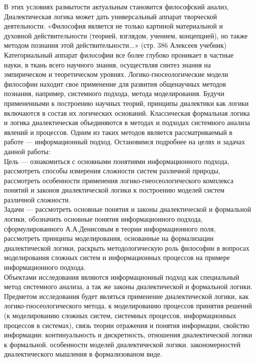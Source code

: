 \documentclass[a4paper,12pt]{report}
\begin{document}
В этих условиях размытости актуальным становится философский анализ, Диалектическая логика может дать универсальный аппарат творческой деятельности. «Философия является не только картиной материальной и духовной действительности (теорией, взглядом, учением, концепцией), но также методом познания этой действительности...»  (стр. 386 Алексеев учебник) Категориальный аппарат философии  все более глубоко проникает в частные науки, в ткань всего научного знания, осуществляя синтез знания на эмпирическом и теоретическом уровнях. Логико-гносеологические модели философии находит свое применение для развития общенаучных методов познания, например, системного подхода, метода моделирования. Будучи примененными к построению научных теорий, принципы диалектики как логики включаются в состав их логических оснований.
Классическая формальная логика и логика диалектическая объединяются в методах и подходах системного анализа явлений и процессов. Одним из таких методов является рассматриваемый в работе — информационный подход. Остановимся подробнее на целях и задачах данной работы:\\

	Цель — ознакомиться с основными понятиями информационного подхода, рассмотреть способы измерения сложности систем различной природы, рассмотреть особенности применения логико-гнеосеологического комплекса понятий и законов диалектической логики к построению моделей систем различной сложности.\\
	
	Задачи —  рассмотреть основные понятия и законы диалектической и формальной логики,  обозначить основные понятия информационного подхода, сформулированного А.А.Денисовым в теории информационного поля, рассмотреть принципы моделирования, основанные на формализации диалектической логики, раскрыть методологическую роль философии в  вопросах моделирования сложных систем и информационных процессов на примере информационного подхода. \\
	
	Объектами исследования являются информационный подход как специальный метод системного анализа, а так же законы диалектической и формальной логики.\\
	
	Предметом исследования будет являться применение диалектической логики, как логико-гносеологического метода, к моделированию процессов принятия решений (к моделированию сложных систем, системных процессов, информационных процессов в системах), связь теории отражения и понятия информации, свойство информации: континуальность и дискретность,  отношения диалектической логики к формальной. особенности моделей диалектической логики.  закономерностей диалектического мышления в формализованом виде.\\
	
\end{document}
